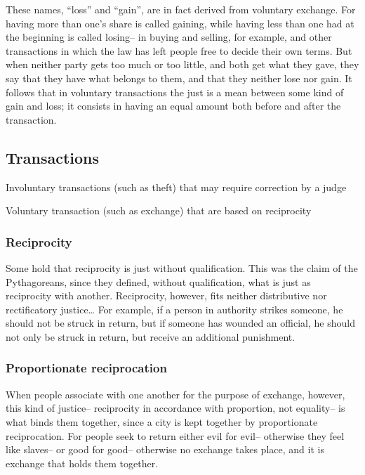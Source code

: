                 These names, “loss” and “gain”, are in fact derived from voluntary exchange. For having more than one’s share is called gaining, while having less than one had at the beginning is called losing– in buying and selling, for example, and other transactions in which the law has left people free to decide their own terms. But when neither party gets too much or too little, and both get what they gave, they say that they have what belongs to them, and that they neither lose nor gain. It follows that in voluntary transactions the just is a mean between some kind of gain and loss; it consists in having an equal amount both before and after the transaction.

            \subsection{Transactions}

                \begin{definition}
                    Involuntary transactions (such as theft) that may require correction by a judge
                \end{definition}

                \begin{definition}
                    Voluntary transaction (such as exchange) that are based on reciprocity
                \end{definition}

                \subsubsection{Reciprocity}

                    Some hold that reciprocity is just without qualification. This was the claim of the Pythagoreans, since they defined, without qualification, what is just as reciprocity with another. Reciprocity, however, fits neither distributive nor rectificatory justice… For example, if a person in authority strikes someone, he should not be struck in return, but if someone has wounded an official, he should not only be struck in return, but receive an additional punishment.

                \subsubsection{Proportionate reciprocation}

                    When people associate with one another for the purpose of exchange, however, this kind of justice– reciprocity in accordance with proportion, not equality– is what binds them together, since a city is kept together by proportionate reciprocation. For people seek to return either evil for evil– otherwise they feel like slaves– or good for good– otherwise no exchange takes place, and it is exchange that holds them together.

